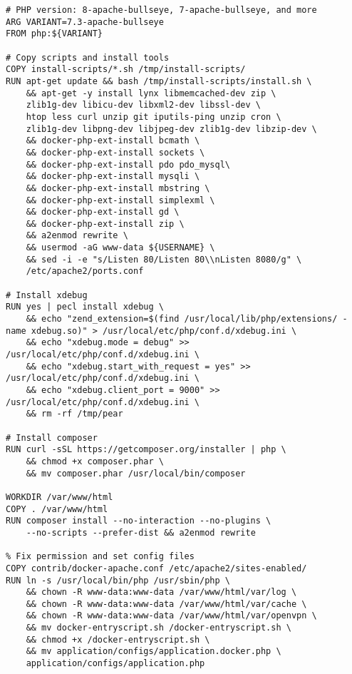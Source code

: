
\begin{lstlisting}[language=docker, frame=single, caption={PHP DevContainer Dockerfile},label=code::docker_dev_php]
# PHP version: 8-apache-bullseye, 7-apache-bullseye, and more
ARG VARIANT=7.3-apache-bullseye
FROM php:${VARIANT}

# Copy scripts and install tools
COPY install-scripts/*.sh /tmp/install-scripts/
RUN apt-get update && bash /tmp/install-scripts/install.sh \
    && apt-get -y install lynx libmemcached-dev zip \
    zlib1g-dev libicu-dev libxml2-dev libssl-dev \
    htop less curl unzip git iputils-ping unzip cron \
    zlib1g-dev libpng-dev libjpeg-dev zlib1g-dev libzip-dev \
    && docker-php-ext-install bcmath \
    && docker-php-ext-install sockets \
    && docker-php-ext-install pdo pdo_mysql\
    && docker-php-ext-install mysqli \
    && docker-php-ext-install mbstring \
    && docker-php-ext-install simplexml \
    && docker-php-ext-install gd \
    && docker-php-ext-install zip \
    && a2enmod rewrite \
    && usermod -aG www-data ${USERNAME} \
    && sed -i -e "s/Listen 80/Listen 80\\nListen 8080/g" \
    /etc/apache2/ports.conf

# Install xdebug
RUN yes | pecl install xdebug \
    && echo "zend_extension=$(find /usr/local/lib/php/extensions/ -name xdebug.so)" > /usr/local/etc/php/conf.d/xdebug.ini \
    && echo "xdebug.mode = debug" >> /usr/local/etc/php/conf.d/xdebug.ini \
    && echo "xdebug.start_with_request = yes" >> /usr/local/etc/php/conf.d/xdebug.ini \
    && echo "xdebug.client_port = 9000" >> /usr/local/etc/php/conf.d/xdebug.ini \
    && rm -rf /tmp/pear

# Install composer
RUN curl -sSL https://getcomposer.org/installer | php \
    && chmod +x composer.phar \
    && mv composer.phar /usr/local/bin/composer

WORKDIR /var/www/html
COPY . /var/www/html
RUN composer install --no-interaction --no-plugins \
    --no-scripts --prefer-dist && a2enmod rewrite

% Fix permission and set config files
COPY contrib/docker-apache.conf /etc/apache2/sites-enabled/
RUN ln -s /usr/local/bin/php /usr/sbin/php \
    && chown -R www-data:www-data /var/www/html/var/log \
    && chown -R www-data:www-data /var/www/html/var/cache \
    && chown -R www-data:www-data /var/www/html/var/openvpn \
    && mv docker-entryscript.sh /docker-entryscript.sh \
    && chmod +x /docker-entryscript.sh \
    && mv application/configs/application.docker.php \
    application/configs/application.php
\end{lstlisting}



